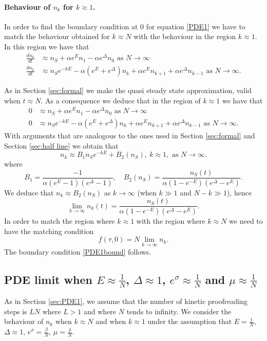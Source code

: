 \documentclass{article}
\numberwithin{equation}{section}
\theoremstyle{plain}
\begin{document}
\paragraph{Behaviour of $n_k$ for $k \approx 1 $.}
In order to find the boundary condition at $0 $ for equation \eqref{PDE1} we have to match the behaviour obtained for $k \approx N $ with the behaviour in the region $k \approx 1 $. 
In this region we have that 
   \begin{align*}  
    \frac{d n_0 }{dt} & \approx  n_S  + \alpha e^E n_1 - \alpha e^{\Delta} n_0 \text{ as } N \to \infty  \\
        \frac{d n_k }{dt} & \approx n_S e^{- k E} - \alpha \left(  e^E + e^\Delta  \right)  n_k + \alpha e^E n_{k+1}  + \alpha e^{\Delta} n_{k-1} \text{ as } N \to \infty.
         \end{align*} 

As in Section \ref{sec:formal} we make the quasi steady state approximation, valid when $t \approx N $. 
As a consequence we deduce that in the region of $k \approx 1 $ we have that 
   \begin{align*}  
  0& \approx  n_S  + \alpha e^E n_1 - \alpha e^{\Delta} n_0 \text{ as } N \to \infty  \\
       0 & \approx n_S e^{- k E} - \alpha \left(  e^E + e^\Delta  \right)  n_k + \alpha e^E n_{k+1}  + \alpha e^{\Delta} n_{k-1} \text{ as } N \to \infty. 
         \end{align*} 
         With arguments that are analogous to the ones used in Section \ref{sec:formal} and Section \ref{sec:half line} we obtain that 
         \[
         n_k \approx B_1 n_S e^{- k E } + B_2(n_S), \ k \approx 1,  \text{ as } N \to \infty.
         \]
where 
\[
B_1 = \frac{-1}{ \alpha (e^E -1 ) (e^\Delta -1 )}, \quad B_2(n_S)=   \frac{  n_S(t) }{\alpha (1-e^{- E }) (e^\Delta - e^E)} . 
\]
We deduce that $n_k \approx B_2(n_S) $ as $k \to \infty $ (when $k \gg 1 $ and $N- k \gg 1 $), hence 
\[ 
  \lim_{k \to \infty } n_k (t)=  \frac{n_S(t) }{ \alpha (1-e^{- E })(e^\Delta - e^E) }  .
\] 
In order to match the region where $k \approx 1$ with the region where $k \approx N $ we need to have the matching condition 
\[
f(\tau, 0 ) = N  \lim_{k \to \infty } n_k. 
\]
The boundary condition \eqref{PDE1bound} follows. 

\subsection{PDE limit when $E\approx \frac{1}{N} $, $\Delta \approx 1$, $e^\sigma \approx \frac{1}{N}$ and $\mu \approx \frac{1}{N}$} \label{sec:PDE2}
As in Section \ref{sec:PDE1}, we assume that the number of kinetic proofreading steps is $L N $ where $L > 1$ and where $N $ tends to infinity. 
We consider the behaviour of $n_k$ when $k \approx N $ and when $k \approx 1 $ under the assumption that $E= \frac{1}{N}$, $\Delta \approx 1$, $e^\sigma= \frac{\beta}{N}$, $\mu= \frac{\delta}{N}$. 
\end{document}
